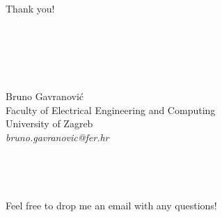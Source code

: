 \documentclass{Bredelebeamer}
\begin{document}
\begin{frame}
\huge{\centerline{Thank you!}}

\newline
\\~\\
\\~\\
\footnotesize{	\begin{center}
		Bruno Gavranović \\
		Faculty of Electrical Engineering and Computing \\
		University of Zagreb \\
		\textit{bruno.gavranovic@fer.hr} \\
		\\~\\
		\\~\\
		Feel free to drop me an email with any questions!
\end{center}}
\end{frame}

\end{document}
